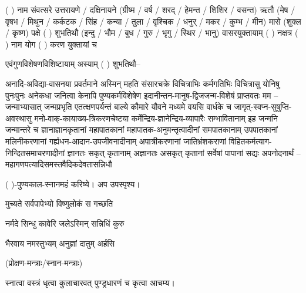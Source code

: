 (   ) नाम संवत्सरे उत्तरायणे / दक्षिनायने 
(ग्रीष्म / वर्ष / शरद् / हेमन्त / शिशिर / वसन्त) ऋतौ  (मेष / वृषभ / मिथुन / कर्कटक / सिंह / कन्या / तुला / 
वृश्चिक / धनुर् / मकर / कुम्भ / मीन) मासे (शुक्ल / कृष्ण) पक्षे ( ) शुभतिथौ
(इन्दु / भौम / बुध / गुरु / भृगु / स्थिर / भानु) वासरयुक्तायाम्
(  ) नक्षत्र (  ) नाम  योग  (  ) करण युक्तायां च 

एवं\-गुण\-विशेषण\-विशिष्टायाम् अस्याम् ( ) शुभतिथौ–

अनादि-अविद्या-वासनया प्रवर्तमाने अस्मिन् महति संसारचक्रे विचित्राभिः कर्मगतिभिः विचित्रासु योनिषु
पुनःपुनः अनेकधा जनित्वा केनापि पुण्यकर्मविशेषेण इदानीन्तन-मानुष-द्विजजन्म-विशेषं प्राप्तवतः मम –\\
जन्माभ्यासात् जन्मप्रभृति एतत्क्षणपर्यन्तं बाल्ये कौमारे यौवने मध्यमे वयसि वार्धके च
जागृत्-स्वप्न-सुषुप्ति-अवस्थासु मनो-वाक्-कायाख्य-त्रिकरणचेष्टया कर्मेन्द्रिय-ज्ञानेन्द्रिय-व्यापारैः
सम्भावितानाम् इह जन्मनि जन्मान्तरे च ज्ञानाज्ञानकृतानां महापातकानां महापातक-अनुमन्तृत्वादी\-नां
समपातकानाम् उपपातकानां मलिनी\-करणानां गर्ह्यधन-आदान-उपजीवनादीनाम् अपात्रीकरणानां जातिभ्रंश\-कराणां
विहित\-कर्म\-त्याग-निन्दित\-समाचरणादीनां ज्ञानतः सकृत् कृतानाम् अज्ञानतः असकृत् कृतानां सर्वेषां पापानां
सद्यः अपनोदनार्थं –\\
महागणपत्यादिसमस्तवैदिकदेवतासन्निधौ

( )-पुण्यकाल-स्नानमहं करिष्ये। अप उपस्पृश्य।

{मुच्यते सर्वपापेभ्यो विष्णुलोकं स गच्छति}%

{नर्मदे सिन्धु कावेरि जलेऽस्मिन् सन्निधिं कुरु}

{भैरवाय नमस्तुभ्यम् अनुज्ञां दातुम् अर्हसि}

\centerline{(प्रोक्षण-मन्त्राः/स्नान-मन्त्राः)} 

स्नात्वा वस्त्रं धृत्वा कुलाचारवत् पुण्ड्रधारणं च कृत्वा आचम्य।

\closesection